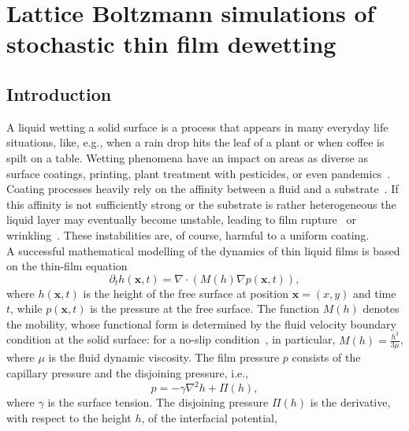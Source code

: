 \chapter{Lattice Boltzmann simulations of stochastic thin film dewetting}
\label{chapter:second_paper}

\section{Introduction}\label{sec:intro}
A liquid wetting a solid surface is a process that appears in many everyday life situations, like, e.g., when a rain drop hits the leaf of a plant or when coffee is spilt on a table.
Wetting phenomena have an impact on areas as diverse as surface coatings, printing, plant treatment with pesticides, or even pandemics~\cite{RevModPhys.69.931, doi:10.1146/annurev-fluid-011212-140734, cassie1944wettability, Lenormand_1990,DERYCK1998278, doi:10.1146/annurev.fluid.31.1.347,BergeronNature,BhardwajPoF2020}.
Coating processes heavily rely on the affinity between a fluid and a substrate~\cite{RevModPhys.81.739}.
If this affinity is not sufficiently strong or the substrate is rather heterogeneous the liquid layer may eventually become unstable,
leading to film rupture~\cite{RevModPhys.69.931, RevModPhys.81.1131} or wrinkling~\cite{DASILVASOBRINHO19991204}. 
These instabilities are, of course, harmful to a uniform coating.\\ 
A successful mathematical modelling of the dynamics of thin liquid films is based on the thin-film equation~\cite{Reynolds, RevModPhys.69.931}
\begin{equation}\label{eq:thin_film}
    \partial_t h(\mathbf{x},t) = \nabla\cdot\left(M(h)\nabla p(\mathbf{x},t)\right),
\end{equation}
where $h(\mathbf{x},t)$ is the height of the free surface at position $\mathbf{x} = (x,y)$ and time $t$, while $p(\mathbf{x},t)$ is the pressure at the free surface.
The function $M(h)$ denotes the mobility, whose
functional form is determined by the fluid velocity boundary condition at 
the solid surface: for a no-slip condition~\cite{RevModPhys.69.931}, in particular, $M(h)=\frac{h^3}{3\mu}$, where $\mu$ is the fluid dynamic viscosity.
The film pressure $p$ consists of the capillary pressure and the disjoining pressure, i.e.,
\begin{equation}\label{eq:pressure}
    p = - \gamma\nabla^2 h + \Pi(h),
\end{equation}
where $\gamma$ is the surface tension. The disjoining pressure
$\Pi(h)$ is the derivative, with respect to the height $h$, of the interfacial potential,
